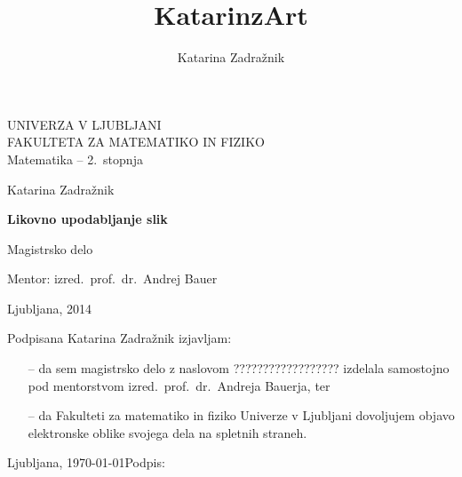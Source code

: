 \documentclass[11pt,a4paper,twoside,slovene]{book}
\author{Katarina Zadražnik} %
\title{KatarinzArt} %
\begin{document}
\frontmatter
\pagestyle{empty}

\begin{flushleft}
\noindent
\textsc{\Large UNIVERZA V LJUBLJANI}\\
\textsc{\Large FAKULTETA ZA MATEMATIKO IN FIZIKO}\\
\medskip
\Large Matematika -- 2.\ stopnja
\end{flushleft}

\vfill

\begin{center}
 {\LARGE Katarina Zadražnik} %

  \bigskip
  \medskip
  {\bfseries {\Huge Likovno upodabljanje slik}} %

  \bigskip
  \medskip

  {\LARGE Magistrsko delo}
  
  \bigskip
  \medskip
  
  {\Large Mentor: izred.\ prof.\ dr.\ Andrej Bauer} %
\end{center}

\vfill
\vfill
\noindent
{\Large Ljubljana, 2014} %

\cleardoublepage

\null
\vfill
\noindent Podpisana {Katarina Zadražnik} izjavljam: %
\begin{itemize}
 \item[--] da sem magistrsko delo z naslovom ?????????????????? izdelala samostojno pod mentorstvom {izred.\ prof.\ dr.\ Andreja Bauerja}, ter %
 \item[--] da Fakulteti za matematiko in fiziko Univerze v Ljubljani dovoljujem objavo elektronske oblike svojega dela na spletnih straneh.
\end{itemize}
Ljubljana, \today \hfill Podpis:\hspace{5cm} %

\cleardoublepage

\end{document}
